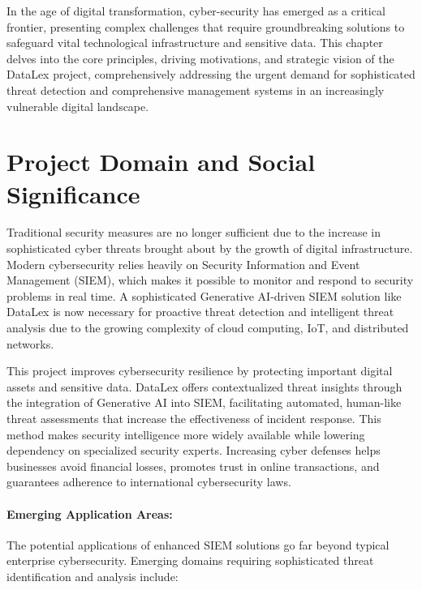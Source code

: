 In the age of digital transformation, cyber-security has emerged as a critical frontier, presenting complex challenges that require groundbreaking solutions to safeguard vital technological infrastructure and sensitive data. This chapter delves into the core principles, driving motivations, and strategic vision of the DataLex project, comprehensively addressing the urgent demand for sophisticated threat detection and comprehensive management systems in an increasingly vulnerable digital landscape.

\section{Project Domain and Social Significance}
\label{sec_project_domain}

Traditional security measures are no longer sufficient due to the increase in sophisticated cyber threats brought about by the growth of digital infrastructure. Modern cybersecurity relies heavily on Security Information and Event Management (SIEM), which makes it possible to monitor and respond to security problems in real time. A sophisticated Generative AI-driven SIEM solution like DataLex is now necessary for proactive threat detection and intelligent threat analysis due to the growing complexity of cloud computing, IoT, and distributed networks.

This project improves cybersecurity resilience by protecting important digital assets and sensitive data. DataLex offers contextualized threat insights through the integration of Generative AI into SIEM, facilitating automated, human-like threat assessments that increase the effectiveness of incident response. This method makes security intelligence more widely available while lowering dependency on specialized security experts. Increasing cyber defenses helps businesses avoid financial losses, promotes trust in online transactions, and guarantees adherence to international cybersecurity laws.

\paragraph{Emerging Application Areas:}
The potential applications of enhanced SIEM solutions go far beyond typical enterprise cybersecurity. Emerging domains requiring sophisticated threat identification and analysis include:

